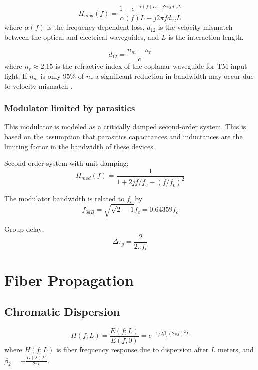 \documentclass[a4paper]{article}
\begin{document}
\begin{equation}
H_{mod}(f) = \frac{1-e^{-\alpha(f)L+j2\pi fd_{12}L}}{\alpha(f)L-j2\pi fd_{12}L}
\end{equation}
where $\alpha(f)$ is the frequency-dependent loss, $d_{12}$ is the velocity mismatch between the optical and electrical waveguides, and $L$ is the interaction length.

\begin{equation}
d_{12} = \frac{n_m-n_r}{c}
\end{equation}
where $n_r \approx 2.15$ is the refractive index of the coplanar waveguide for TM input light. If $n_m$ is only $95\%$ of $n_r$ a significant reduction in bandwidth may occur due to velocity mismatch \cite{Ho2005}.

\subsubsection{Modulator limited by parasitics}
This modulator is modeled as a critically damped second-order system. This is based on the assumption that parasitics capacitances and inductances are the limiting factor in the bandwidth of these devices.

Second-order system with unit damping:
\begin{equation}
H_{mod}(f) =  \frac{1}{1 + 2jf/f_c - (f/f_c)^2}
\end{equation}

The modulator bandwidth is related to $f_c$ by
\begin{equation}
f_{3dB} = \sqrt{\sqrt{2}-1}f_c = 0.64359f_c
\end{equation}

Group delay:
\begin{equation}
\Delta\tau_g = \frac{2}{2\pi f_c}
\end{equation}

\section{Fiber Propagation}
\subsection{Chromatic Dispersion}
\begin{equation}
H(f; L) = \frac{E(f; L)}{E(f, 0)} = e^{-1/2\beta_2(2\pi f)^2L}
\end{equation}
where $H(f; L)$ is fiber frequency response due to dispersion after $L$ meters, and $\beta_2 = -\frac{D(\lambda)\lambda^2}{2\pi c}$. 
\end{document}
